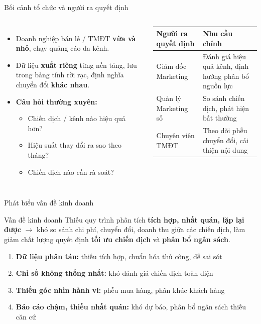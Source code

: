 \documentclass[aspectratio=169]{beamer}
\renewcommand{\footnotesize}{\tiny}
\begin{document}
\begin{frame}{Bối cảnh tổ chức và người ra quyết định}
  \small
  \begin{columns}[T,onlytextwidth]
    \begin{itemize}
      \setlength{\itemsep}{0.4em}
      \item Doanh nghiệp bán lẻ / TMĐT \textbf{vừa và nhỏ}, chạy
        quảng cáo đa kênh.
      \item Dữ liệu \textbf{xuất riêng} từng nền tảng, lưu trong
        bảng tính rời rạc, định nghĩa chuyển đổi \textbf{khác nhau}.
      \item \textbf{Câu hỏi thường xuyên:}
        \begin{itemize}
          \setlength{\itemsep}{0.1em}
          \item Chiến dịch / kênh nào hiệu quả hơn?
          \item Hiệu suất thay đổi ra sao theo tháng?
          \item Chiến dịch nào cần rà soát?
        \end{itemize}
    \end{itemize}
    \centering
    \renewcommand{\arraystretch}{1.3}
    \footnotesize
    \begin{tabular}{@{}p{2.2cm}p{3.3cm}@{}}
      \toprule
      \textbf{Người ra quyết định} & \textbf{Nhu cầu chính} \\
      \midrule
      Giám đốc Marketing & Đánh giá hiệu quả kênh, định hướng phân bổ nguồn lực \\
      Quản lý Marketing số & So sánh chiến dịch, phát hiện bất thường \\
      Chuyên viên TMĐT & Theo dõi phễu chuyển đổi, cải thiện nội dung \\
      \bottomrule
    \end{tabular}
  \end{columns}
\end{frame}

\begin{frame}{Phát biểu vấn đề kinh doanh}
  \small
  \begin{block}{Vấn đề kinh doanh}
    Thiếu quy trình phân tích \textbf{tích hợp, nhất quán, lặp lại
    được} $\rightarrow$ khó so sánh chi phí, chuyển đổi, doanh thu
    giữa các chiến dịch, làm giảm chất lượng quyết định
    \textbf{tối ưu chiến dịch} và \textbf{phân bổ ngân sách}.
  \end{block}
  \vspace{0.2cm}
  \begin{enumerate}
    \setlength{\itemsep}{0.4em}
    \item \textbf{Dữ liệu phân tán:} thiếu tích hợp, chuẩn hóa thủ công, dễ sai sót
    \item \textbf{Chỉ số không thống nhất:} khó đánh giá chiến dịch
      toàn diện
    \item \textbf{Thiếu góc nhìn hành vi:} phễu mua hàng, phân khúc
      khách hàng
    \item \textbf{Báo cáo chậm, thiếu nhất quán:} khó dự báo, phân
      bổ ngân sách thiếu căn cứ
  \end{enumerate}
\end{frame}
\end{document}
